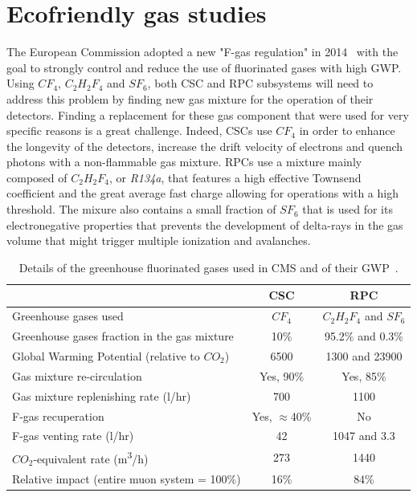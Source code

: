\section{Ecofriendly gas studies}
\label{chapt3:sec:EcoGas}

	The European Commission adopted a new "F-gas regulation" in 2014~\cite{EUFGAS2014} with the goal to strongly control and reduce the use of fluorinated gases with high \acf{GWP}. Using $CF_4$, $C_2H_2F_4$ and $SF_6$, both CSC and RPC subsystems will need to address this problem by finding new gas mixture for the operation of their detectors. Finding a replacement for these gas component that were used for very specific reasons is a great challenge. Indeed, CSCs use $CF_4$ in order to enhance the longevity of the detectors, increase the drift velocity of electrons and quench photons with a non-flammable gas mixture. RPCs use a mixture mainly composed of $C_2H_2F_4$, or \textit{R134a}, that features a high effective Townsend coefficient and the great average fast charge allowing for operations with a high threshold. The mixure also contains a small fraction of $SF_6$ that is used for its electronegative properties that prevents the development of delta-rays in the gas volume that might trigger multiple ionization and avalanches.
	
	\begin{table}[H]
		\centering
		\begin{tabular}{l c c}
			\hline
			 & CSC & RPC\\
			\hline
			Greenhouse gases used & $CF_4$ & $C_2H_2F_4$ and $SF_6$ \\
			Greenhouse gases fraction in the gas mixture & 10\% & 95.2\% and 0.3\% \\
			Global Warming Potential (relative to $CO_2$) & 6500 & 1300 and 23900 \\
			Gas mixture re-circulation & Yes, 90\% & Yes, 85\% \\
			Gas mixture replenishing rate (\si{l/hr}) & 700 & 1100 \\
			F-gas recuperation & Yes, $\approx$40\% & No \\
			F-gas venting rate (\si{l/hr}) & 42 & 1047 and 3.3 \\
			$CO_2$-equivalent rate (\si{m^3/h}) & 273 & 1440 \\
			Relative impact (entire muon system = 100\%) & 16\% & 84\% \\
			\hline
		\end{tabular}
		\caption{\label{tab:F-GAS-CMS} Details of the greenhouse fluorinated gases used in CMS and of their GWP~\cite{PHASEIITP}.}
	\end{table}
	
